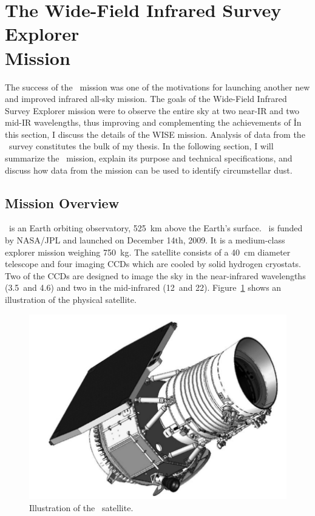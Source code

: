    
\section{The Wide-Field Infrared Survey Explorer\\ Mission}\label{sec:wise_intro}

    The success of the \iras\ mission was one of the motivations for launching another new and improved infrared all-sky mission. The goals of the Wide-Field Infrared Survey Explorer mission \citep[WISE;][]{Wright2010} were to observe the entire sky at two near-IR and two mid-IR wavelengths, thus improving and complementing the achievements of \iras\. In this section, I discuss the details of the WISE mission. Analysis of data from the \WS\ survey constitutes the bulk of my thesis. In the following section, I will summarize the \WS\ mission, explain its purpose and technical specifications, and discuss how data from the mission can be used to identify circumstellar dust. 
   

    \subsection{Mission Overview}\label{sec:wise_overview}


    \WS\ is an Earth orbiting observatory, 525~km above the Earth's surface. \WS\ is funded by NASA/JPL and launched on December 14th, 2009. It is a medium-class explorer mission weighing 750~kg. The satellite consists of a 40~cm diameter telescope and four imaging CCDs which are cooled by solid hydrogen cryostats. Two of the CCDs are designed to image the sky in the near-infrared wavelengths (3.5\micron\ and 4.6\micron) and two in the mid-infrared (12\micron\ and 22\micron). Figure~\ref{fig:WISE_Satellite} shows an illustration of the physical satellite. 
  
    
    \begin{figure}
    \centering
    \includegraphics[width=\textwidth]{Ch2/wise_satellite}
    \caption[\WS\ Satellite]{Illustration of the \WS\ satellite.}
    \label{fig:WISE_Satellite}
    \end{figure}
    
